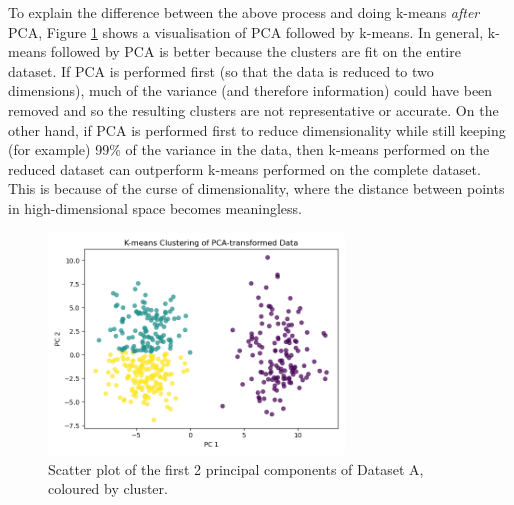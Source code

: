 \documentclass{article}
\begin{document}
\begin{enumerate}[label=\alph*)]
    To explain the difference between the above process and doing k-means \textit{after} PCA, Figure \ref{fig:Q1e_PCA_KMeans} shows a visualisation of PCA followed by k-means. In general, k-means followed by PCA is better because the clusters are fit on the entire dataset. If PCA is performed first (so that the data is reduced to two dimensions), much of the variance (and therefore information) could have been removed and so the resulting clusters are not representative or accurate. On the other hand, if PCA is performed first to reduce dimensionality while still keeping (for example) 99\% of the variance in the data, then k-means performed on the reduced dataset can outperform k-means performed on the complete dataset. This is because of the curse of dimensionality, where the distance between points in high-dimensional space becomes meaningless.
    \begin{figure}[!htb]
        \centering
        \includegraphics[width=0.7\textwidth]{Q1e_KMeans_after_PCA.png}
        \caption{Scatter plot of the first 2 principal components of Dataset A, coloured by cluster.}
        \label{fig:Q1e_PCA_KMeans}
    \end{figure}
\end{enumerate}

\newpage
\end{document}
